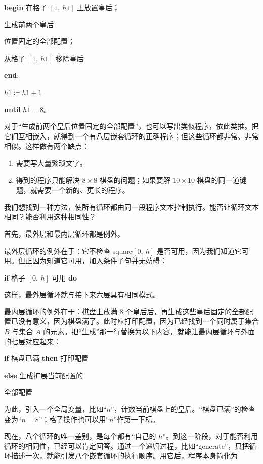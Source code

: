 \documentclass[twoside,11pt,fontset=none]{ctexbook}
\begin{document}
\quad \textbf{begin} 在格子 $[1,\ h1]$ 上放置皇后；

\quad \quad 生成前两个皇后

\quad \quad \quad 位置固定的全部配置；

\quad \quad 从格子 $[1,\ h1]$ 移除皇后

\quad \textbf{end};

\quad $h1 \coloneq h1 + 1$

\textbf{until} $h1 = 8$。

对于“生成前两个皇后位置固定的全部配置”，也可以写出类似程序，依此类推。把它们互相嵌入，就得到一个有八层嵌套循环的正确程序；但这些循环都非常、非常相似。这样做有两个缺点：

\begin{enumerate}[wide, nosep, label=(\arabic*)]
	\item 需要写大量繁琐文字。
	\item 得到的程序只能解决 $8\times 8$ 棋盘的问题；如果要解 $10\times 10$ 棋盘的同一道谜题，就需要一个新的、更长的程序。
\end{enumerate}

我们想找到一种方法，使所有循环都由同一段程序文本控制执行。能否让循环文本相同？能否利用这种相同性？

首先，最外层和最内层循环都是例外。

最外层循环的例外在于：它不检查 square$[0,\ h]$ 是否可用，因为我们知道它可用。但正因为知道它可用，加入条件子句并无妨碍：

\quad \textbf{if} 格子 $[0,\ h]$ 可用 \textbf{do}

\noindent
这样，最外层循环就与接下来六层具有相同模式。

最内层循环的例外在于：棋盘上放满 8 个皇后后，再生成这些皇后固定的全部配置已没有意义，因为棋盘满了。此时应打印配置，因为已经找到一个同时属于集合 $B$ 与集合 $A$ 的元素。把“生成”那一行替换为以下内容，就能让最内层循环与外面的七层对应起来：

\textbf{if} 棋盘已满 \textbf{\textbf{then}} 打印配置

\quad \textbf{else} 生成扩展当前配置的

\quad\quad 全部配置

为此，引入一个全局变量，比如“$n$”，计数当前棋盘上的皇后。“棋盘已满”的检查变为“$n = 8$”；格子操作也可以用“$n$”作第一下标。

现在，八个循环的唯一差别，是每个都有“自己的 $h$”。到这一阶段，对于能否利用循环的相同性，已经可以肯定回答。通过一个递归过程，比如“generate”，只把循环描述一次，就能引发八个嵌套循环的执行顺序。用它后，程序本身简化为
\end{document}
